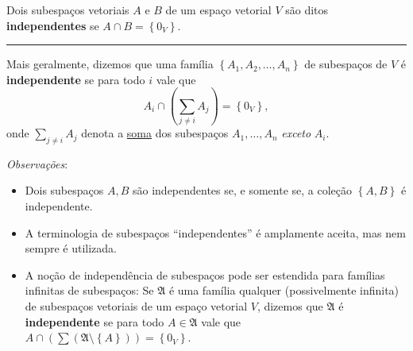 \begin{definition}
	Dois subespaços vetoriais $A$ e $B$ de um espaço vetorial $V$ são ditos \textbf{independentes} se $A\cap B=\left\{0_V\right\}$.
	
	\hrule
	
	Mais geralmente, dizemos que uma família $\left\{A_1,A_2,\ldots,A_n\right\}$ de subespaços de $V$ é \textbf{independente} se para todo $i$ vale que
	\[A_i\cap \left(\sum_{j\neq i}A_j\right)=\left\{0_V\right\},\]
	onde $\sum_{j\neq i}A_j$ denota a \href{http://mtm.ufsc.br/~cordeiro/ensino/mtm3112.algebra.linear/03.somas/con_soma_de_subesp_moodle.html}{soma} dos subespaços $A_1,\ldots,A_n$ \emph{exceto} $A_i$.
\end{definition}

\emph{Observações}:
\begin{itemize}
\item Dois subespaços $A,B$ são independentes se, e somente se, a coleção $\left\{A,B\right\}$ é independente.
\item A terminologia de subespaços ``independentes'' é amplamente aceita, mas nem sempre é utilizada.
\item A noção de independência de subespaços pode ser estendida para famílias infinitas de subespaços: Se $\mathfrak{A}$ é uma família qualquer (possivelmente infinita) de subespaços vetoriais de um espaço vetorial $V$, dizemos que $\mathfrak{A}$ é \textbf{independente} se para todo $A\in\mathfrak{A}$ vale que $A\cap\left(\sum\left(\mathfrak{A}\setminus\left\{A\right\}\right)\right)=\left\{0_V\right\}$.
\end{itemize}